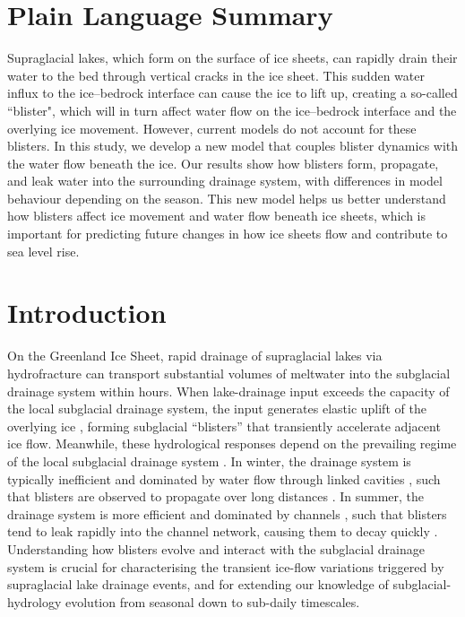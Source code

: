 \documentclass[draft]{agujournal2019}
\begin{document}
\section*{Plain Language Summary}
Supraglacial lakes, which form on the surface of ice sheets, can rapidly drain their water to the bed through vertical cracks in the ice sheet. This sudden water influx to the ice--bedrock interface can cause the ice to lift up, creating a so-called ``blister", which will in turn affect water flow on the ice--bedrock interface and the overlying ice movement. However, current models do not account for these blisters. In this study, we develop a new model that couples blister dynamics with the water flow beneath the ice. Our results show how blisters form, propagate, and leak water into the surrounding drainage system, with differences in model behaviour depending on the season. This new model helps us better understand how blisters affect ice movement and water flow beneath ice sheets, which is important for predicting future changes in how ice sheets flow and contribute to sea level rise.


\section{Introduction}\label{sec:intro}
On the Greenland Ice Sheet, rapid drainage of supraglacial lakes via hydrofracture can transport substantial volumes of meltwater into the subglacial drainage system within hours. When lake-drainage input exceeds the capacity of the local subglacial drainage system, the input generates elastic uplift of the overlying ice \cite{das2008Fracture,doyle2013Ice,stevens2015Greenland}, forming subglacial “blisters” \cite{lister2013Viscous,lai2021Hydraulic} that transiently accelerate adjacent ice flow. Meanwhile, these hydrological responses depend on the prevailing regime of the local subglacial drainage system \cite{lai2021Hydraulic}. In winter, the drainage system is typically inefficient and dominated by water flow through linked cavities \cite{schoof2010Icesheet}, such that blisters are observed to propagate over long distances \cite{maier2023Wintertime}. In summer, the drainage system is more efficient and dominated by channels \cite{schoof2010Icesheet}, such that blisters tend to leak rapidly into the channel network, causing them to decay quickly \cite{stevens2022Tidewaterglacier}. Understanding how blisters evolve and interact with the subglacial drainage system is crucial for characterising the transient ice-flow variations triggered by supraglacial lake drainage events, and for extending our knowledge of subglacial-hydrology evolution from seasonal down to sub-daily timescales.
\end{document}
